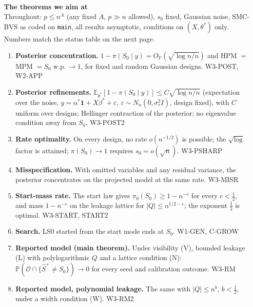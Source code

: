 \documentclass[11pt,a4paper]{article}
\newcommand{\Szero}{S_0}
\newcommand{\Shat}{\hat S^{+}}
\newcommand{\Out}{\mathcal{O}}
\newcommand{\Prob}{\mathbb{P}}
\newcommand{\E}{\mathbb{E}}
\newcommand{\OP}{O_{\mathbb{P}}}
\theoremstyle{definition}
\begin{document}
\begin{center}
{\Large\bfseries\sffamily The theorems we aim at}\\[2pt]
{\footnotesize Throughout: $p\le n^{A}$ (any fixed $A$, $p\gg n$ allowed), $s_0$ fixed, Gaussian noise, SMC-BVS as coded on
\texttt{main}, all results asymptotic, conditions on $(X,\theta^*)$ only. Numbers match the status table on the next page.}
\end{center}

\begin{enumerate}[leftmargin=2em,itemsep=4pt,label=\textbf{\arabic*.}]
\item \textbf{Posterior concentration.} $1-\pi(\Szero\mid y)=\OP(\sqrt{\log n/n})$ and HPM $=$ MPM $=\Szero$ w.p.\,$\to1$, for fixed and random Gaussian designs. \hfill{\footnotesize W3-POST, W2-APP}
\item \textbf{Posterior refinements.} $\E_{\theta^*}[1-\pi(\Szero\mid y)]\le C\sqrt{\log n/n}$ (expectation over the noise, $y=\alpha^*\mathbf 1+X\beta^*+\varepsilon$, $\varepsilon\sim N_n(0,\sigma_*^2I)$, design fixed), with $C$ uniform over designs; Hellinger contraction of the posterior; no eigenvalue condition away from $\Szero$. \hfill{\footnotesize W3-POST2}
\item \textbf{Rate optimality.} On every design, no rate $o(n^{-1/2})$ is possible; the $\sqrt{\log}$ factor is attained; $\pi(\Szero)\to1$ requires $s_0=o(\sqrt n)$. \hfill{\footnotesize W3-PSHARP}
\item \textbf{Misspecification.} With omitted variables and any residual variance, the posterior concentrates on the projected model at the same rate. \hfill{\footnotesize W3-MISR}
\item \textbf{Start-mass rate.} The start law gives $\pi_0(\Szero)\ge1-n^{-c}$ for every $c<\tfrac12$, and mass $1-n^{-c}$ on the leakage lattice for $|Q|\le n^{1/2-\epsilon}$; the exponent $\tfrac12$ is optimal. \hfill{\footnotesize W3-START, START2}
\item \textbf{Search.} LS0 started from the start mode ends at $\Szero$. \hfill{\footnotesize W1-GEN, C-GROW}
\item \textbf{Reported model (main theorem).} Under visibility (V), bounded leakage (L) with polylogarithmic $Q$ and a lattice condition (N): $\Prob(\Out\cap\{\Shat\ne\Szero\})\to0$ for every seed and calibration outcome. \hfill{\footnotesize W3-RM}
\item \textbf{Reported model, polynomial leakage.} The same with $|Q|\le n^{b}$, $b<\tfrac12$, under a width condition (W). \hfill{\footnotesize W3-RM2}

\end{enumerate}
\end{document}
